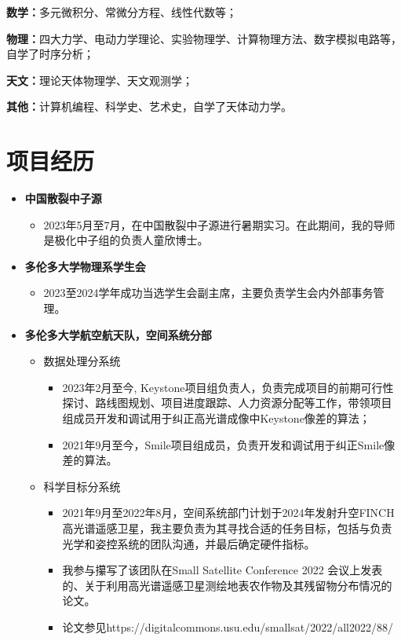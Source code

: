 \documentclass{article}
\begin{document}
\hspace{2em}\textbf{数学：}多元微积分、常微分方程、线性代数等；

\hspace{2em}\textbf{物理：}四大力学、电动力学理论、实验物理学、计算物理方法、数字模拟电路等，自学了时序分析；

\hspace{2em}\textbf{天文：}理论天体物理学、天文观测学；

\hspace{2em}\textbf{其他：}计算机编程、科学史、艺术史，自学了天体动力学。

\section{项目经历}
\indent

\begin{itemize}

  \item \textbf{中国散裂中子源}
  \begin{itemize}
    \item 2023年5月至7月，在中国散裂中子源进行暑期实习。在此期间，我的导师是极化中子组的负责人童欣博士。
  \end{itemize}
  \item \textbf{多伦多大学物理系学生会}
  \begin{itemize}
    \item 2023至2024学年成功当选学生会副主席，主要负责学生会内外部事务管理。
  \end{itemize}
  \item \textbf{多伦多大学航空航天队，空间系统分部}
  \begin{itemize}
    \item 数据处理分系统
    \begin{itemize}
      \item 2023年2月至今, Keystone项目组负责人，负责完成项目的前期可行性探讨、路线图规划、项目进度跟踪、人力资源分配等工作，带领项目组成员开发和调试用于纠正高光谱成像中Keystone像差的算法；
      \item 2021年9月至今，Smile项目组成员，负责开发和调试用于纠正Smile像差的算法。
    \end{itemize}
    
    \item 科学目标分系统
    \begin{itemize}
      \item 2021年9月至2022年8月，空间系统部门计划于2024年发射升空FINCH高光谱遥感卫星，我主要负责为其寻找合适的任务目标，包括与负责光学和姿控系统的团队沟通，并最后确定硬件指标。
      \item 我参与攥写了该团队在Small Satellite Conference 2022 会议上发表的、关于利用高光谱遥感卫星测绘地表农作物及其残留物分布情况的论文。
      \item 论文参见https://digitalcommons.usu.edu/smallsat/2022/all2022/88/
    \end{itemize}
  

\end{itemize}
\end{itemize}
\end{document}
